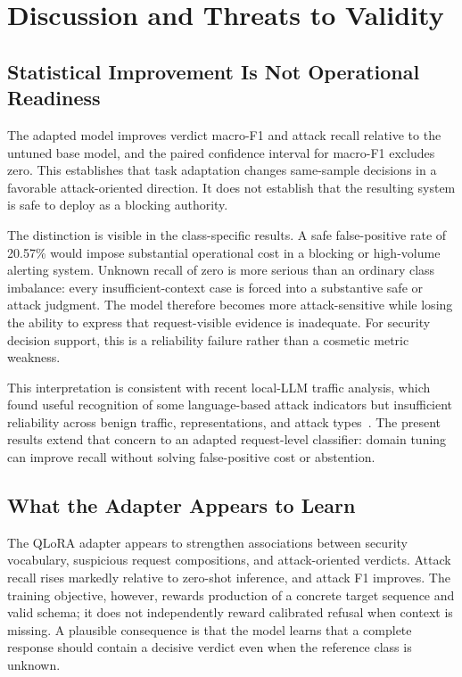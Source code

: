 \section{Discussion and Threats to Validity}
\label{sec:discussion}

\subsection{Statistical Improvement Is Not Operational Readiness}
The adapted model improves verdict macro-F1 and attack recall relative to the untuned base model, and the paired confidence interval for macro-F1 excludes zero. This establishes that task adaptation changes same-sample decisions in a favorable attack-oriented direction. It does not establish that the resulting system is safe to deploy as a blocking authority.

The distinction is visible in the class-specific results. A safe false-positive rate of 20.57\% would impose substantial operational cost in a blocking or high-volume alerting system. Unknown recall of zero is more serious than an ordinary class imbalance: every insufficient-context case is forced into a substantive safe or attack judgment. The model therefore becomes more attack-sensitive while losing the ability to express that request-visible evidence is inadequate. For security decision support, this is a reliability failure rather than a cosmetic metric weakness.

This interpretation is consistent with recent local-LLM traffic analysis, which found useful recognition of some language-based attack indicators but insufficient reliability across benign traffic, representations, and attack types~\citep{paukkeri2026local}. The present results extend that concern to an adapted request-level classifier: domain tuning can improve recall without solving false-positive cost or abstention.

\subsection{What the Adapter Appears to Learn}
The QLoRA adapter appears to strengthen associations between security vocabulary, suspicious request compositions, and attack-oriented verdicts. Attack recall rises markedly relative to zero-shot inference, and attack F1 improves. The training objective, however, rewards production of a concrete target sequence and valid schema; it does not independently reward calibrated refusal when context is missing. A plausible consequence is that the model learns that a complete response should contain a decisive verdict even when the reference class is unknown.

